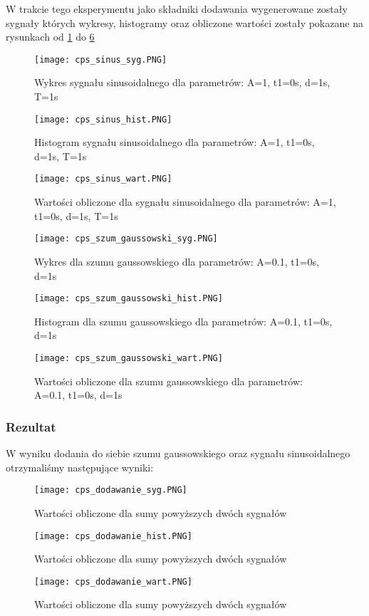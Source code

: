 \documentclass[12pt]{article}
\begin{document}
W trakcie tego eksperymentu jako składniki dodawania wygenerowane zostały sygnały których wykresy, histogramy oraz obliczone wartości zostały pokazane na rysunkach od \ref{wykres dla sinusa} do \ref{wartosci dla szumu gausowskiego}
\begin{figure}[H]
    \centering
    \texttt{[image: cps\_sinus\_syg.PNG]}
    \caption{Wykres sygnału sinusoidalnego dla parametrów:  A=1, t1=0s, d=1s, T=1s}
    \label{wykres dla sinusa}
\end{figure}
\begin{figure}[H]
    \centering
    \texttt{[image: cps\_sinus\_hist.PNG]}
    \caption{Histogram sygnału sinusoidalnego dla parametrów:  A=1, t1=0s, d=1s, T=1s}
    \label{histogram dla sinusa}
\end{figure}
\begin{figure}[H]
    \centering
    \texttt{[image: cps\_sinus\_wart.PNG]}
    \caption{Wartości obliczone dla sygnału sinusoidalnego dla parametrów:  A=1, t1=0s, d=1s, T=1s}
    \label{wartosci dla sinusa}
\end{figure}
\begin{figure}[H]
    \centering
    \texttt{[image: cps\_szum\_gaussowski\_syg.PNG]}
    \caption{Wykres dla szumu gaussowskiego dla parametrów:  A=0.1, t1=0s, d=1s}
    \label{wykres dla szumu gausowskiego}
\end{figure}
\begin{figure}[H]
    \centering
    \texttt{[image: cps\_szum\_gaussowski\_hist.PNG]}
    \caption{Histogram dla szumu gaussowskiego dla parametrów:  A=0.1, t1=0s, d=1s}
    \label{histogram dla szumu gausowskiego}
\end{figure}
\begin{figure}[H]
    \centering
    \texttt{[image: cps\_szum\_gaussowski\_wart.PNG]}
    \caption{Wartości obliczone dla szumu gaussowskiego dla parametrów:  A=0.1, t1=0s, d=1s}
    \label{wartosci dla szumu gausowskiego}
\end{figure}

\subsubsection{Rezultat}
W wyniku dodania do siebie szumu gaussowskiego oraz sygnału sinusoidalnego otrzymaliśmy następujące wyniki:
\begin{figure}[H]
    \centering
    \texttt{[image: cps\_dodawanie\_syg.PNG]}
    \caption{Wartości obliczone dla sumy powyższych dwóch sygnałów}
    \label{wykres dodawania}
\end{figure}
\begin{figure}[H]
    \centering
    \texttt{[image: cps\_dodawanie\_hist.PNG]}
    \caption{Wartości obliczone dla sumy powyższych dwóch sygnałów}
    \label{histogram dodawania}
\end{figure}
\begin{figure}[H]
    \centering
    \texttt{[image: cps\_dodawanie\_wart.PNG]}
    \caption{Wartości obliczone dla sumy powyższych dwóch sygnałów}
    \label{wartosci dodawania}
\end{figure}
\end{document}
